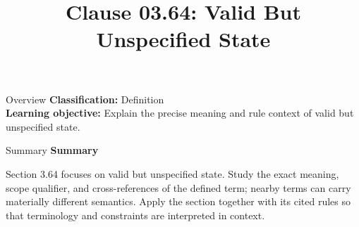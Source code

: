 \documentclass[10pt,letterpaper]{article}
\title{Clause 03.64: Valid But Unspecified State}
\author{}
\date{}
\begin{document}
\maketitle
\begin{CornellOverviewBox}{Overview}
\textbf{Classification:} Definition\\[2pt]
\textbf{Learning objective:} Explain the precise meaning and rule context of valid but unspecified state.
\end{CornellOverviewBox}\begin{CornellSummaryBox}{Summary}
{\sffamily\bfseries\color{Accent} Summary}\par\vspace{3pt}Section 3.64 focuses on valid but unspecified state. Study the exact meaning, scope qualifier, and cross-references of the defined term; nearby terms can carry materially different semantics. Apply the section together with its cited rules so that terminology and constraints are interpreted in context.
\end{CornellSummaryBox}
\end{document}
